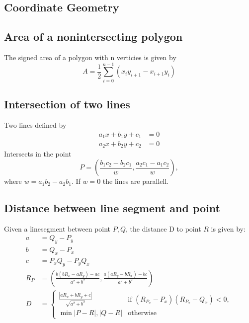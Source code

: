 \documentclass[8pt,a4paper,landscape,oneside]{amsart}
\begin{document}
\begin{multicols*}{3}
\section{Coordinate Geometry}
    \subsection{Area of a nonintersecting polygon}
        The signed area of a polygon with n verticies is given by 
        $$A = \frac{1}{2}\sum_{i=0}^{n-1}(x_iy_{i+1} - x_{i+1}y_i)$$
    \subsection{Intersection of two lines}
        Two lines defined by 
        \begin{align*}
            a_1x + b_1y + c_1 &= 0 \\
            a_2x + b_2y + c_2 &= 0 
        \end{align*}
        Intersects in the point 
        $$P = (\frac{b_1c_2 - b_2c_1}{w}, \frac{a_2c_1 - a_1c_2}{w}),$$
        where $w = a_1b_2 - a_2b_1$. If $w = 0$ the lines are parallell.
        \subsection{Distance between line segment and point}
        Given a linesegment between point $P, Q$, the distance D to point $R$ is given by:
        \begin{align*}
            a &= Q_y - P_y \\
            b &= Q_x - P_x \\
            c &= P_xQ_y - P_yQ_x \\
            R_P &= (\frac{b(bR_x - aR_y) - ac}{a^2 + b^2}, \frac{a(aR_y - bR_x) - bc}{a^2 + b^2}) \\
            D &= 
            \begin{cases}
                \frac{|aR_x + bR_y + c|}{\sqrt{a^2 + b^2}} & \text{if $(R_{P_x}- P_x)(R_{P_x} - Q_x) < 0$}, \\
                \min{|P - R|, |Q - R|} & \text{otherwise}
            \end{cases}
        \end{align*}

\end{multicols*}
\end{document}
